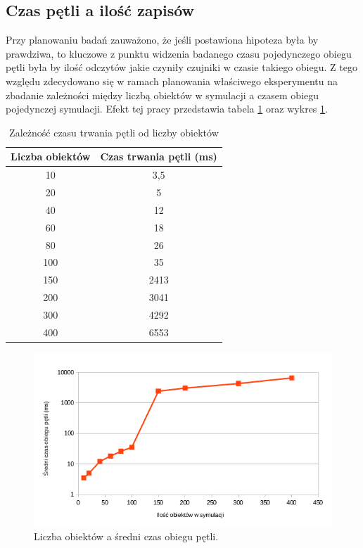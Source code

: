 \subsection{Czas pętli a ilość zapisów}
\par{
Przy planowaniu badań zauważono, że jeśli postawiona hipoteza była by prawdziwa, to kluczowe z punktu widzenia badanego czasu pojedynczego obiegu pętli była by ilość odczytów jakie czyniły czujniki w czasie takiego obiegu. Z tego względu zdecydowano się w ramach planowania właściwego eksperymentu na zbadanie zależności między liczbą obiektów w symulacji a czasem obiegu pojedynczej symulacji. Efekt tej pracy przedstawia tabela \ref{ex_1} oraz wykres \ref{ex_1_chart}.
}
\par{
\begin{table}[t]
\caption{Zależność czasu trwania pętli od liczby obiektów}
\label{ex_1}
\begin{center}
\begin{tabular}{|c|c|}
  \hline 
 \textbf{Liczba obiektów} & \textbf{Czas trwania pętli (ms)} \\
  \hline
  10 & 3,5 \\
  20	 & 5 \\
  40	 & 12 \\
  60	 & 18 \\
  80	 & 26 \\
  100 & 35 \\
  150 & 2413 \\
  200 & 3041 \\
  300 & 4292 \\
  400 & 6553 \\
  \hline  
\end{tabular}
\end{center}
\end{table}
}

\begin{figure}[!ht]
    \begin{center}
	\includegraphics[width=\textwidth,keepaspectratio]{img/wykres_1}
	\caption{Liczba obiektów a średni czas obiegu pętli.}
	\label{ex_1_chart}
    \end{center}
\end{figure}

